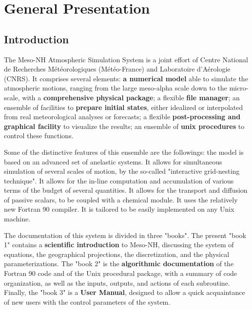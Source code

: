 %
%
%
%

\chapter{General Presentation}

\minitoc


\section{Introduction}
 The Meso-NH Atmospheric Simulation System
is a joint effort of Centre National de
Recherches M\'et\'eorologiques (M\'et\'eo-France) and Laboratoire d'A\'erologie
(CNRS). It comprises several elements:
{\bf a numerical model} able to simulate the atmospheric
motions, ranging from the large meso-alpha scale down to the micro-scale,
with a {\bf comprehensive physical package}; a flexible {\bf file manager};
 an ensemble of facilities to {\bf prepare
initial states}, either idealized or interpolated from real meteorological
analyses or forecasts;
a flexible {\bf post-processing and graphical facility}
 to visualize the results;
an ensemble of {\bf unix procedures} to control these functions.

 Some of the distinctive features of this ensemble are the followings:
the model is based on an advanced set of anelastic systems.
 It allows for simultaneous
 simulation of several scales of motion, by the
so-called  "interactive grid-nesting technique". It allows for the in-line
computation and accumulation of various terms of the budget of several
quantities. It allows for the transport and diffusion of passive scalars,
to be coupled with a chemical module. It uses the relatively new Fortran 90
compiler. It is tailored to be easily implemented on any Unix machine.

The documentation of this system is divided in three "books". The present
"book 1" contains a {\bf scientific introduction} to Meso-NH, discussing the
system of equations, the geographical projections, the discretization, and
the physical parameterizations. The "book 2" is the {\bf algorithmic
documentation}
of the Fortran 90 code and of the Unix procedural package, with a summary
of code organization, as well as the inputs, outputs, and actions of each
subroutine. Finally, the "book 3" is a {\bf User Manual}, designed to allow
a quick acquaintance of new users with the control parameters of the system.

